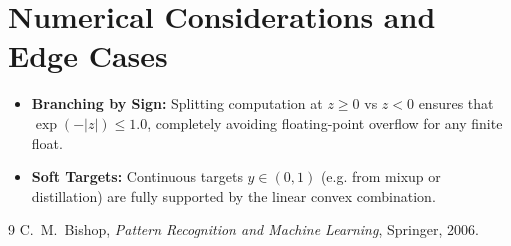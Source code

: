 \documentclass[11pt]{article}
\begin{document}
\section{Numerical Considerations and Edge Cases}
\label{sec:numerical}

\begin{itemize}
    \item \textbf{Branching by Sign:} Splitting computation at $z \ge 0$ vs $z < 0$ ensures that $\exp(-|z|) \le 1.0$, completely avoiding floating-point overflow for any finite float.
    \item \textbf{Soft Targets:} Continuous targets $y \in (0, 1)$ (e.g. from mixup or distillation) are fully supported by the linear convex combination.
\end{itemize}

\begin{thebibliography}{9}
 C.~M.~Bishop, \emph{Pattern Recognition and Machine Learning}, Springer, 2006.
\end{thebibliography}
\end{document}
